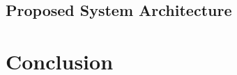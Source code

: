\documentclass{article}
\begin{document}

\subsection{Proposed System Architecture}


\section{Conclusion}



\printbibliography
\end{document}
